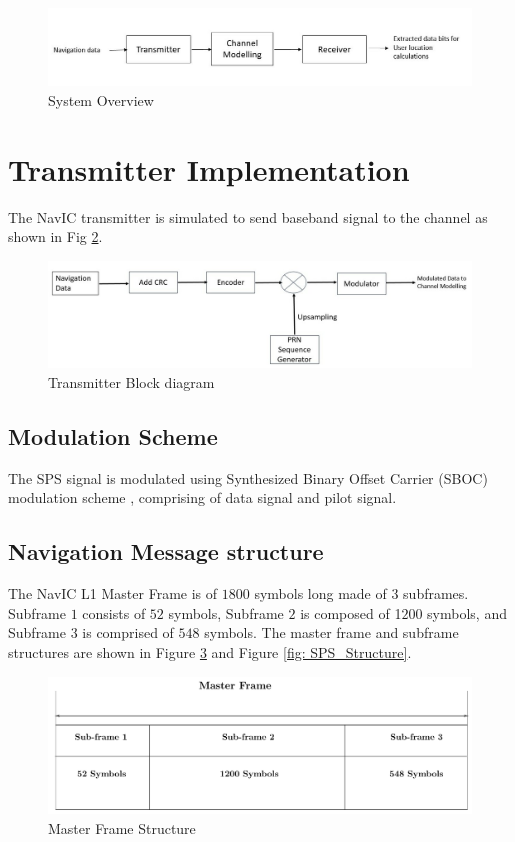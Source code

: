 \documentclass[conference]{IEEEtran}
\begin{document}
\begin{figure}[ht] 
\centering
\includegraphics[width=1\columnwidth]{figs/simulation_overview.jpg}
\centering
\caption{System Overview}
\label{fig:sim_flow}
\end{figure}

\section{Transmitter Implementation}
The NavIC transmitter is simulated to send baseband signal to the channel as shown in Fig \ref{fig:trans_flow}.

\begin{figure}[ht]
    \centering
    \includegraphics[width=1\columnwidth]{figs/trans_flow.jpg}
    \centering
    \caption{Transmitter Block diagram}
    \label{fig:trans_flow}
    \end{figure}


\subsection{Modulation Scheme} 
The SPS signal is modulated using Synthesized Binary Offset Carrier (SBOC) modulation 
scheme \cite{b2}, comprising of data signal and pilot signal. 

\subsection{Navigation Message structure}
The NavIC L1 Master Frame \cite{b2} is of $1800$ symbols long made of $3$ subframes. Subframe $1$ consists 
of $52$ symbols, Subframe $2$ is composed of 1$200$ symbols, and Subframe $3$ is comprised of 
$548$ 
symbols. The master frame and subframe \cite{b2} structures are shown in Figure \ref{fig:master_frame} and 
Figure \ref{fig: SPS_Structure}.

\begin{figure}[ht]
\centering
\includegraphics[width=1\columnwidth]{figs/master_frame}
\centering
\caption{Master Frame Structure}
\label{fig:master_frame}
\end{figure}
\end{document}
